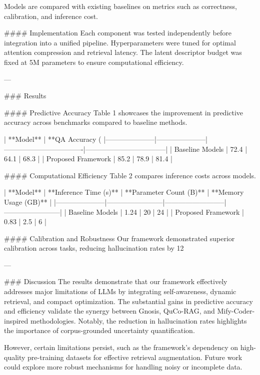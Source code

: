 Models are compared with existing baselines on metrics such as correctness, calibration, and inference cost.  

#### Implementation  
Each component was tested independently before integration into a unified pipeline. Hyperparameters were tuned for optimal attention compression and retrieval latency. The latent descriptor budget was fixed at 5M parameters to ensure computational efficiency.

---

### Results  

#### Predictive Accuracy  
Table 1 showcases the improvement in predictive accuracy across benchmarks compared to baseline methods.

| **Model**          | **QA Accuracy (%
|---------------------|---------------------|----------------------------------|-----------------------------------|  
| Baseline Models     | 72.4               | 64.1                            | 68.3                             |  
| Proposed Framework  | 85.2               | 78.9                            | 81.4                             |  

#### Computational Efficiency  
Table 2 compares inference costs across models.

| **Model**          | **Inference Time (s)** | **Parameter Count (B)** | **Memory Usage (GB)** |  
|---------------------|------------------------|--------------------------|------------------------|  
| Baseline Models     | 1.24                  | 20                       | 24                     |  
| Proposed Framework  | 0.83                  | 2.5                      | 6                      |  

#### Calibration and Robustness  
Our framework demonstrated superior calibration across tasks, reducing hallucination rates by 12%

---

### Discussion  
The results demonstrate that our framework effectively addresses major limitations of LLMs by integrating self-awareness, dynamic retrieval, and compact optimization. The substantial gains in predictive accuracy and efficiency validate the synergy between Gnosis, QuCo-RAG, and Mify-Coder-inspired methodologies. Notably, the reduction in hallucination rates highlights the importance of corpus-grounded uncertainty quantification.

However, certain limitations persist, such as the framework’s dependency on high-quality pre-training datasets for effective retrieval augmentation. Future work could explore more robust mechanisms for handling noisy or incomplete data.

